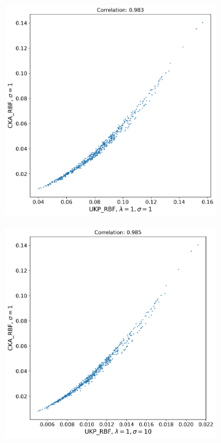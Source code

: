 \documentclass[11pt]{article}
\theoremstyle{plain}
\begin{document}
\begin{figure}[h!]
    \centering
    \begin{subfigure}[b]{0.45\textwidth}
        \includegraphics[width=\textwidth]{Appendix figures/imagenet_experiments/Correlation final/Correlation plot for CKA_dist_RBF_1.000000e+00 and UKP_dist_RBF_1.000000e+00_1.000000e+00.png}
    \end{subfigure}
    \hfill
    \begin{subfigure}[b]{0.45\textwidth}
        \includegraphics[width=\textwidth]{Appendix figures/imagenet_experiments/Correlation final/Correlation plot for CKA_dist_RBF_1.000000e+00 and UKP_dist_RBF_1.000000e+00_1.000000e+01.png}
    \end{subfigure}
    

\end{figure}
\end{document}
